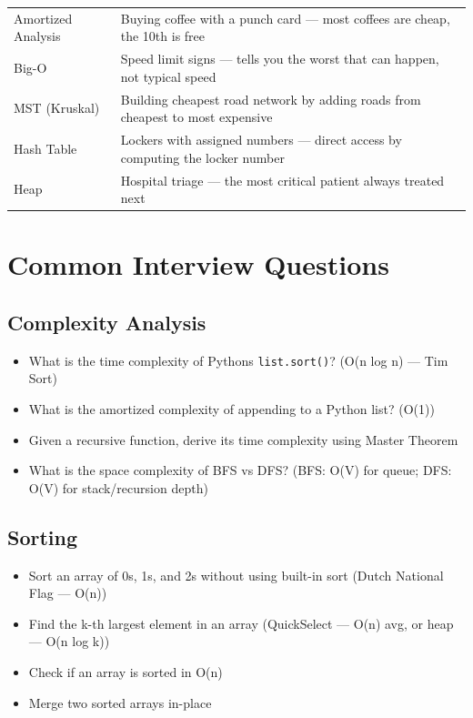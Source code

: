 \documentclass[11pt]{article}
\providecommand{\tightlist}{\setlength{\itemsep}{1pt}\setlength{\parskip}{0pt}}
\begin{document}
\begin{longtable}[]{@{}
  >{\raggedright\arraybackslash}p{}
  >{\raggedright\arraybackslash}p{}@{}}
Amortized Analysis & Buying coffee with a punch card --- most coffees are cheap, the 10th is free \\
\rowcolor{zebra}
Big-O & Speed limit signs --- tells you the worst that can happen, not typical speed \\
MST (Kruskal) & Building cheapest road network by adding roads from cheapest to most expensive \\
\rowcolor{zebra}
Hash Table & Lockers with assigned numbers --- direct access by computing the locker number \\
Heap & Hospital triage --- the most critical patient always treated next \\
\end{longtable}

\section{Common Interview Questions}\label{common-interview-questions}

\subsection{Complexity Analysis}\label{complexity-analysis-1}

\begin{itemize}
\tightlist
\item
  What is the time complexity of Python\textquotesingle s \texttt{list.sort()}? (O(n log n) --- Tim Sort)
\item
  What is the amortized complexity of appending to a Python list? (O(1))
\item
  Given a recursive function, derive its time complexity using Master Theorem
\item
  What is the space complexity of BFS vs DFS? (BFS: O(V) for queue; DFS: O(V) for stack/recursion depth)
\end{itemize}

\subsection{Sorting}\label{sorting-1}

\begin{itemize}
\tightlist
\item
  Sort an array of 0s, 1s, and 2s without using built-in sort (Dutch National Flag --- O(n))
\item
  Find the k-th largest element in an array (QuickSelect --- O(n) avg, or heap --- O(n log k))
\item
  Check if an array is sorted in O(n)
\item
  Merge two sorted arrays in-place
\end{itemize}
\end{document}
